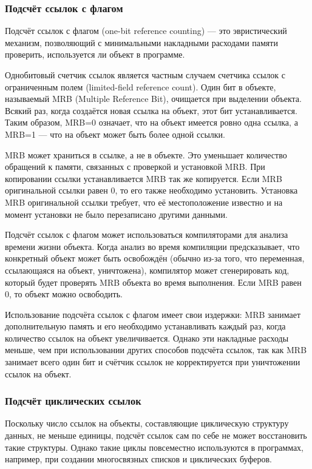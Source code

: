 \clearpage
\subsubsection{Подсчёт ссылок с флагом}

Подсчёт ссылок с флагом (one-bit reference counting) \cite{glossary} --- это эвристический механизм, позволяющий с минимальными накладными расходами памяти проверить, используется ли объект в программе.

Однобитовый счетчик ссылок является частным случаем счетчика ссылок с ограниченным полем (limited-field reference count). Один бит в объекте, называемый MRB (Multiple Reference Bit), очищается при выделении объекта. Всякий раз, когда создаётся новая ссылка на объект, этот бит устанавливается. Таким образом, MRB=0 означает, что на объект имеется ровно одна ссылка, а MRB=1 --- что на объект может быть более одной ссылки. \cite{glossary}

MRB может храниться в ссылке, а не в объекте. Это уменьшает количество обращений к памяти, связанных с проверкой и установкой MRB. При копировании ссылки устанавливается MRB так же копируется. Если MRB оригинальной ссылки равен 0, то его также необходимо установить. Установка MRB оригинальной ссылки требует, что её местоположение известно и на момент установки не было перезаписано другими данными. \cite{glossary}

Подсчёт ссылок с флагом может использоваться компиляторами для анализа времени жизни объекта. Когда анализ во время компиляции предсказывает, что конкретный объект может быть освобождён (обычно из-за того, что переменная, ссылающаяся на объект, уничтожена), компилятор может сгенерировать код, который будет проверять MRB объекта во время выполнения. Если MRB равен 0, то объект можно освободить. \cite{glossary}

Использование подсчёта ссылок с флагом имеет свои издержки: MRB занимает дополнительную память и его необходимо устанавливать каждый раз, когда количество ссылок на объект увеличивается. Однако эти накладные расходы меньше, чем при использовании других способов подсчёта ссылок, так как MRB занимает всего один бит и счётчик ссылок не корректируется при уничтожении ссылок на объект. \cite{glossary}

\clearpage
\subsubsection{Подсчёт циклических ссылок}

Поскольку число ссылок на объекты, составляющие циклическую структуру данных, не меньше единицы, подсчёт ссылок сам по себе не может восстановить такие структуры. Однако
такие циклы повсеместно используются в программах, например, при создании многосвязных списков и циклических буферов. \cite{handbook}


